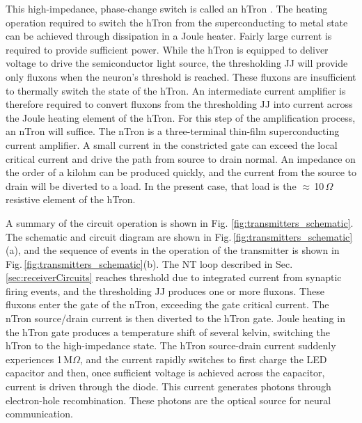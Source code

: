\documentclass[twocolumn]{article}
\begin{document}
This high-impedance, phase-change switch is called an hTron \cite{zhto2018}. The heating operation required to switch the hTron from the superconducting to metal state can be achieved through dissipation in a Joule heater. Fairly large current is required to provide sufficient power. While the hTron is equipped to deliver voltage to drive the semiconductor light source, the thresholding JJ will provide only fluxons when the neuron's threshold is reached. These fluxons are insufficient to thermally switch the state of the hTron. An intermediate current amplifier is therefore required to convert fluxons from the thresholding JJ into current across the Joule heating element of the hTron. For this step of the amplification process, an nTron \cite{mcbe2014} will suffice. The nTron is a three-terminal thin-film superconducting current amplifier. A small current in the constricted gate can exceed the local critical current and drive the path from source to drain normal. An impedance on the order of a kilohm can be produced quickly, and the current from the source to drain will be diverted to a load. In the present case, that load is the $\approx$\,10\,$\Omega$ resistive element of the hTron. 

A summary of the circuit operation is shown in Fig. \ref{fig:transmitters_schematic}. The schematic and circuit diagram are shown in Fig.\,\ref{fig:transmitters_schematic}(a), and the sequence of events in the operation of the transmitter is shown in Fig.\,\ref{fig:transmitters_schematic}(b). The NT loop described in Sec.\,\ref{sec:receiverCircuits} reaches threshold due to integrated current from synaptic firing events, and the thresholding JJ produces one or more fluxons. These fluxons enter the gate of the nTron, exceeding the gate critical current. The nTron source/drain current is then diverted to the hTron gate. Joule heating in the hTron gate produces a temperature shift of several kelvin, switching the hTron to the high-impedance state. The hTron source-drain current suddenly experiences 1\,M$\Omega$, and the current rapidly switches to first charge the LED capacitor and then, once sufficient voltage is achieved across the capacitor, current is driven through the diode. This current generates photons through electron-hole recombination. These photons are the optical source for neural communication.
\end{document}
